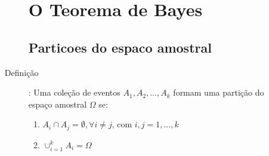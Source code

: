 \documentclass[11pt,a4paper]{book}
\begin{document}
\begin{description}
\begin{enumerate}[leftmargin=*, label=\Roman*., widest=IV, align=left]
\begin{description}
\begin{description}

 \end{description}
 \section{O Teorema de Bayes}
 \subsection{Particoes do espaco amostral}
     \item[Definição]: Uma coleção de eventos $A_1, A_2, \ldots, A_k$ formam uma partição 
     do espaço amostral $\Omega$ se:

     \begin{enumerate}[leftmargin=*, label=\Roman*., widest=IV, align=left]
       \item $A_i \cap A_j = \emptyset, \forall i\neq j$, com $i,j =1,\ldots,k$
       \item $\cup_{i=1}^{k}A_i= \Omega$
     \end{enumerate}
   \end{description}

\end{enumerate}
\end{description}
\end{document}
